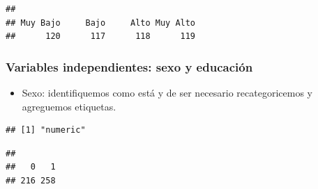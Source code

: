 \documentclass[
]{article}
\newenvironment{Shaded}{\begin{snugshade}}{\end{snugshade}}
\newcommand{\AttributeTok}[1]{\textcolor[rgb]{0.13,0.29,0.53}{#1}}
\newcommand{\DecValTok}[1]{\textcolor[rgb]{0.00,0.00,0.81}{#1}}
\newcommand{\FunctionTok}[1]{\textcolor[rgb]{0.13,0.29,0.53}{\textbf{#1}}}
\newcommand{\NormalTok}[1]{#1}
\newcommand{\OtherTok}[1]{\textcolor[rgb]{0.56,0.35,0.01}{#1}}
\newcommand{\SpecialCharTok}[1]{\textcolor[rgb]{0.81,0.36,0.00}{\textbf{#1}}}
\newcommand{\StringTok}[1]{\textcolor[rgb]{0.31,0.60,0.02}{#1}}
\providecommand{\tightlist}{%
  \setlength{\itemsep}{0pt}\setlength{\parskip}{0pt}}
\begin{document}
\begin{verbatim}
## 
## Muy Bajo     Bajo     Alto Muy Alto 
##      120      117      118      119
\end{verbatim}

\hypertarget{variables-independientes-sexo-y-educaciuxf3n}{%
\subsubsection{Variables independientes: sexo y
educación}\label{variables-independientes-sexo-y-educaciuxf3n}}

\begin{itemize}
\tightlist
\item
  Sexo: identifiquemos como está y de ser necesario recategoricemos y
  agreguemos etiquetas.
\end{itemize}

\begin{Shaded}
\end{Shaded}

\begin{verbatim}
## [1] "numeric"
\end{verbatim}

\begin{Shaded}
\end{Shaded}

\begin{verbatim}
## 
##   0   1 
## 216 258
\end{verbatim}

\begin{Shaded}
\end{Shaded}
\end{document}
